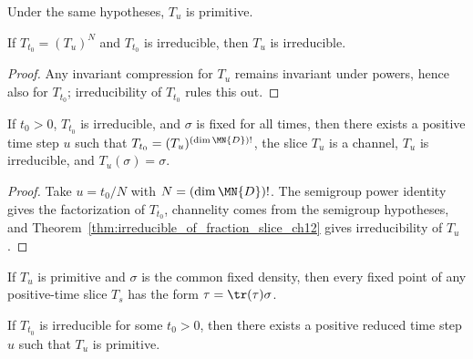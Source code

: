 \begin{theorem}
    \label{thm:primitive_of_fraction_slice_ch12}
    \leanok
    Under the same hypotheses, $T_u$ is primitive.
\end{theorem}

\begin{theorem}
    \label{thm:irreducible_of_fraction_slice_ch12}
    \leanok
    If $T_{t_0}=(T_u)^N$ and $T_{t_0}$ is irreducible, then $T_u$ is irreducible.
\end{theorem}

\begin{proof}
    \leanok
    Any invariant compression for $T_u$ remains invariant under powers, hence also for
    $T_{t_0}$; irreducibility of $T_{t_0}$ rules this out.
\end{proof}

\begin{theorem}
    \label{thm:exists_irreducible_fraction_slice_ch12}
    \leanok
    If $t_0>0$, $T_{t_0}$ is irreducible, and $\sigma$ is fixed for all times,
    then there exists a positive time step $u$ such that
    $T_{t_0}=(T_u)^{(\dim \MN{D})!}$, the slice $T_u$ is a channel,
    $T_u$ is irreducible, and $T_u(\sigma)=\sigma$.
\end{theorem}

\begin{proof}
    \leanok
    Take $u=t_0/N$ with $N=(\dim \MN{D})!$. The semigroup power identity gives the
    factorization of $T_{t_0}$, channelity comes from the semigroup hypotheses, and
    Theorem~\ref{thm:irreducible_of_fraction_slice_ch12} gives irreducibility of $T_u$.
\end{proof}

\begin{theorem}
    \label{thm:fixedPoint_eq_trace_smul_of_primitive_slice_ch12}
    \leanok
    If $T_u$ is primitive and $\sigma$ is the common fixed density, then
    every fixed point of any positive-time slice $T_s$ has the form
    $\tau=\tr(\tau)\sigma$.
\end{theorem}

\begin{theorem}
    \label{thm:exists_primitive_fraction_slice_ch12}
    \leanok
    If $T_{t_0}$ is irreducible for some $t_0>0$, then there exists a
    positive reduced time step $u$ such that $T_u$ is primitive.
\end{theorem}


